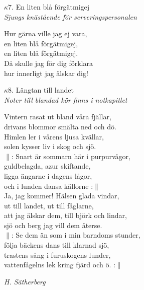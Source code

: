 \documentclass[a6paper,10pt]{article}
\begin{document}
\setlength{\oddsidemargin}{-0.47in}
\noindent
\begin{center}
\Large $\kappa7$. En liten blå förgätmigej \\ 
\small\textit{Sjungs knästående för serveringspersonalen}
\end{center}
Hur gärna ville jag ej vara,\\
en liten blå förgätmigej,\\
en liten blå förgätmigej.\\
Då skulle jag för dig förklara\\
hur innerligt jag älskar dig!
\vspace{30pt}
\begin{center}
\Large $\kappa8$. Längtan till landet \\ 
\small\textit{Noter till blandad kör finns i notkapitlet}
\end{center}
Vintern rasat ut bland våra fjällar,\\
drivans blommor smälta ned och dö.\\
Himlen ler i vårens ljusa kvällar,\\
solen kysser liv i skog och sjö.
\vspace{5pt}\\
$\|$: Snart är sommarn här i purpurvågor,\\
guldbelagda, azur skiftande,\\
ligga ängarne i dagens lågor,\\
och i lunden dansa källorne :$\|$
\vspace{5pt}\\
Ja, jag kommer! Hälsen glada vindar,\\
ut till landet, ut till fåglarne,\\
att jag älskar dem, till björk och lindar,\\
sjö och berg jag vill dem återse.
\vspace{5pt}\\
$\|$: Se dem än som i min barndoms stunder,\\
följa bäckens dans till klarnad sjö,\\
trastens sång i furuskogens lunder,\\
vattenfågelns lek kring fjärd och ö. :$\|$
\begin{flushright}
\textit{H. Sätherberg}
\end{flushright}
\end{document}

